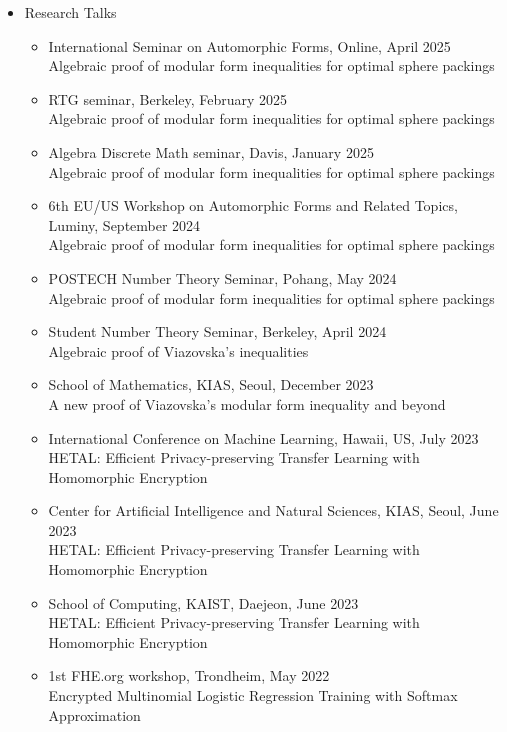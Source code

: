 \documentclass[letterpaper,11pt]{article}
\newlength{\outerbordwidth}
\newcommand{\resheading}[1]{\vspace{8pt}
  \parbox{\textwidth}{\setlength{\FrameSep}{\outerbordwidth}
    \begin{shaded}
\setlength{\fboxsep}{0pt}\framebox[\textwidth][l]{\setlength{\fboxsep}{4pt}\fcolorbox{shadecolorB}{shadecolorB}{\textbf{\sffamily{\mbox{~}\makebox[6.762in][l]{\large #1} \vphantom{p\^{E}}}}}}
    \end{shaded}
  }\vspace{-5pt}
}
\begin{document}
\resheading{Talks}
\begin{itemize}
	\item Research Talks
	\begin{itemize}
		\item International Seminar on Automorphic Forms, Online, April 2025 \\
		Algebraic proof of modular form inequalities for optimal sphere packings 
		\item RTG seminar, Berkeley, February 2025 \\
		Algebraic proof of modular form inequalities for optimal sphere packings 
		\item Algebra Discrete Math seminar, Davis, January 2025 \\
		Algebraic proof of modular form inequalities for optimal sphere packings 
		\item 6th EU/US Workshop on Automorphic Forms and Related Topics, Luminy, September 2024 \\
		Algebraic proof of modular form inequalities for optimal sphere packings 
		\item POSTECH Number Theory Seminar, Pohang, May 2024 \\
		Algebraic proof of modular form inequalities for optimal sphere packings 
		\item Student Number Theory Seminar, Berkeley, April 2024 \\
		Algebraic proof of Viazovska's inequalities
		\item School of Mathematics, KIAS, Seoul, December 2023 \\
		A new proof of Viazovska's modular form inequality and beyond
		\item International Conference on Machine Learning, Hawaii, US, July 2023 \\
		HETAL: Efficient Privacy-preserving Transfer Learning with Homomorphic Encryption
		\item Center for Artificial Intelligence and Natural Sciences, KIAS, Seoul, June 2023 \\
		HETAL: Efficient Privacy-preserving Transfer Learning with Homomorphic Encryption
		\item School of Computing, KAIST, Daejeon, June 2023 \\
		HETAL: Efficient Privacy-preserving Transfer Learning with Homomorphic Encryption
		\item 1st FHE.org workshop, Trondheim, May 2022 \\
		Encrypted Multinomial Logistic Regression Training with Softmax Approximation

\end{itemize}
\end{itemize}
\end{document}
